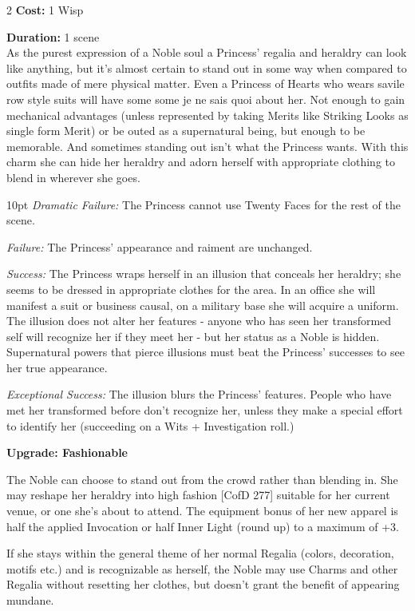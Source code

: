 \begin{multicols}{2}
\noindent \textbf{Cost:} 1 Wisp 

\noindent \textbf{Duration:} 1 scene \\

\noindent As the purest expression of a Noble soul a Princess' regalia and heraldry can look like anything, but it's almost certain to stand out in some way when compared to outfits made of mere physical matter. Even a Princess of Hearts who wears savile row style suits will have some some je ne sais quoi about her. Not enough to gain mechanical advantages (unless represented by taking Merits like Striking Looks as single form Merit) or be outed as a supernatural being, but enough to be memorable. And sometimes standing out isn't what the Princess wants. With this charm she can hide her heraldry and adorn herself with appropriate clothing to blend in wherever she goes.

\begin{myindentpar}{10pt}
    \emph{Dramatic Failure:} The Princess cannot use Twenty Faces for the rest of the scene.

    \emph{Failure:} The Princess' appearance and raiment are unchanged.

    \emph{Success:} The Princess wraps herself in an illusion that conceals her heraldry; she seems to be dressed in appropriate clothes for the area. In an office she will manifest a suit or business causal, on a military base she will acquire a uniform. The illusion does not alter her features - anyone who has seen her transformed self will recognize her if they meet her - but her status as a Noble is hidden. Supernatural powers that pierce illusions must beat the Princess' successes to see her true appearance.

    \emph{Exceptional Success:} The illusion blurs the Princess' features. People who have met her transformed before don't recognize her, unless they make a special effort to identify her (succeeding on a Wits + Investigation roll.)
	
\textbf{Upgrade: Fashionable}

The Noble can choose to stand out from the crowd rather than blending in. She may reshape her heraldry into high fashion [CofD 277] suitable for her current venue, or one she’s about to attend. The equipment bonus of her new apparel is half the applied Invocation or half Inner Light (round up) to a maximum of +3. 

If she stays within the general theme of her normal Regalia (colors, decoration, motifs etc.) and is recognizable as herself, the Noble may use Charms and other Regalia without resetting her clothes, but doesn’t grant the benefit of appearing mundane. 
	

\end{myindentpar}
\end{multicols}
